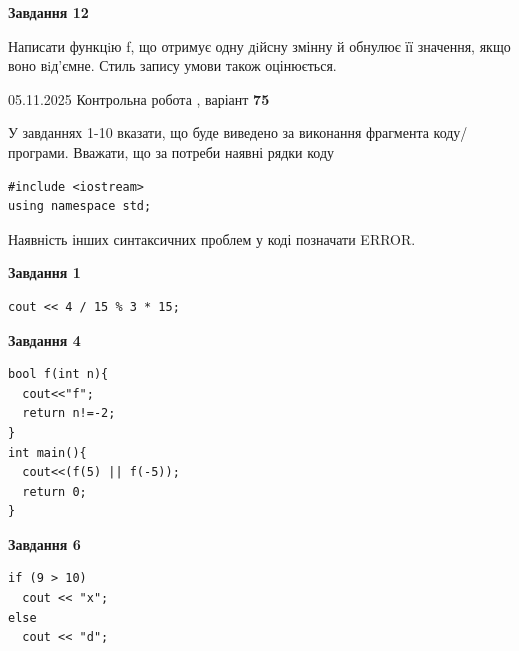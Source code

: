 \documentclass[12pt, ukrainian]{article}
\begin{document}
{\begin {large}
\begin{minipage}[t]{11.0cm}
\begin{center}
\textbf{Завдання 12}
\end{center}

Написати функцiю f, що отримує одну дiйсну змінну й обнулює її значення, якщо воно вiд'ємне. Стиль запису умови також оцінюється.\par

\end{minipage}

\end {large}}
\newpage

{\Large{05.11.2025 Контрольна робота , варіант  \No \textbf { 75 }\par}}
{
\begin {large}
У завданнях 1-10 вказати, що буде виведено за виконання фрагмента коду/про\-гра\-ми.
Вважати, що за потреби наявні рядки коду
\begin{verbatim}
#include <iostream>
using namespace std;
\end{verbatim}
Наявність інших синтаксичних проблем у коді позначати ERROR.

\begin{minipage}[t]{7.0cm}

\begin{center}
\textbf{Завдання 1}
\end{center}
\vspace{-8mm}

\begin{verbatim}
cout << 4 / 15 % 3 * 15;
\end{verbatim}



\begin{center}
\textbf{Завдання 4}
\end{center}
\vspace{-8mm}

\begin{verbatim}
bool f(int n){
  cout<<"f";
  return n!=-2;
}
int main(){
  cout<<(f(5) || f(-5));
  return 0;
}
\end{verbatim}



\begin{center}
\textbf{Завдання 6}
\end{center}
\vspace{-8mm}

\begin{verbatim}
if (9 > 10)
  cout << "x";
else
  cout << "d";
\end{verbatim}




\end{minipage}
\end{large}}
\end{document}

